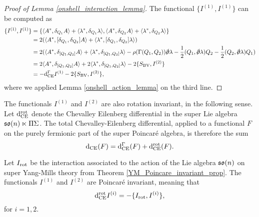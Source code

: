 \documentclass[10pt, oneside]{article}
\begin{document}
\begin{proof}[Proof of Lemma \ref{onshell_interaction_lemma}]
The functional $\{I^{(1)},I^{(1)}\}$ can be computed as 
\begin{align*}
\{I^{(1)},I^{(1)}\} &= \{\<A^* , \delta_{Q_1} A\> + \<\lambda^*, \delta_{Q_1} \lambda\>, \<A^* , \delta_{Q_2} A\> + \<\lambda^*, \delta_{Q_2} \lambda\> \} \\
&= 2(\langle A^*, [\delta_{Q_1}, \delta_{Q_2}] A \rangle + \langle \lambda^*, [\delta_{Q_1}, \delta_{Q_2}] \lambda \rangle) \\
 &= 2(\langle A^*, \delta_{[Q_1,Q_2]} A \rangle + \langle \lambda^*, \delta_{[Q_1,Q_2]} \lambda \rangle  - \rho(\Gamma(Q_1,Q_2)) \sd \dd \lambda - \frac 12(Q_1, \sd \dd \lambda)Q_2 - \frac 12(Q_2, \sd \dd \lambda)Q_1) \\
 &= 2\langle A^*, \delta_{[Q_1,Q_2]} A \rangle + 2\langle \lambda^*, \delta_{[Q_1,Q_2]} \lambda \rangle - 2\{S_{\mr{BV}} , I^{(2)}\} \\
 &= - \d_{\mr{CE}}^\Gamma I^{(1)} -2\{S_{\mr{BV}} , I^{(2)}\},
\end{align*}
where we applied Lemma \ref{onshell_action_lemma} on the third line. 
\end{proof}

The functionals $I^{(1)}$ and $I^{(2)}$ are also rotation invariant, in the following sense.  Let ${\rm d}^{\mathrm{rot}}_{\mathrm{CE}}$ denote the Chevalley Eilenberg differential in the super Lie algebra $\mathfrak{so}(n) \ltimes \Pi \Sigma$.  The total Chevalley-Eilenberg differential, applied to a functional $F$ on the purely fermionic part of the super Poincar\'e algebra, is therefore the sum
\[{\rm d}_{\mathrm{CE}}(F) = {\rm d}^\Gamma_{\mathrm{CE}}(F) + {\rm d}^{\mathrm{rot}}_{\mathrm{CE}}(F).\]

\begin{lemma} \label{SUSY_rotation_invariance_lemma}
Let $I_{\mathrm{rot}}$ be the interaction associated to the action of the Lie algebra $\mathfrak{so}(n)$ on super Yang-Mills theory from Theorem \ref{YM_Poincare_invariant_prop}.  The functionals $I^{(1)}$ and $I^{(2)}$ are Poincar\'e invariant, meaning that
\begin{equation}\label{rot_invariance_eqn}
 {\rm d}^{\mathrm{rot}}_{\mathrm{CE}} I^{(i)} = - \{I_{\mathrm{rot}}, I^{(i)}\},
\end{equation}
for $i=1,2$.
\end{lemma}
\end{document}
